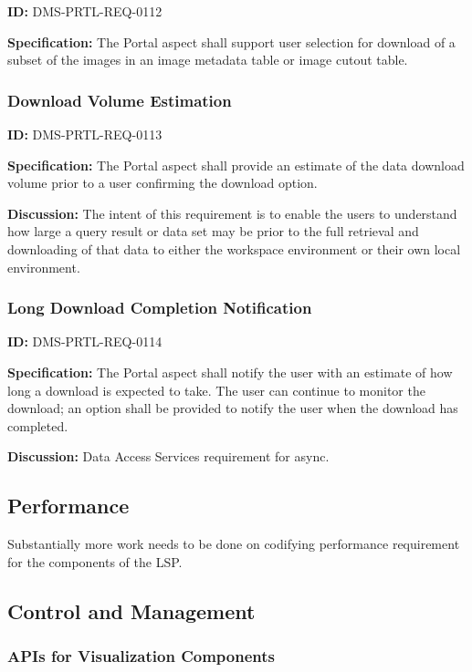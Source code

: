 \documentclass[SE,toc]{lsstdoc}
\begin{document}
\label{DMS-PRTL-REQ-0112}
\textbf{ID:} DMS-PRTL-REQ-0112

\textbf{Specification:}
The Portal aspect shall support user selection for download of a subset of the images in an image metadata table or image cutout table.

\subsubsection{Download Volume Estimation}

\label{DMS-PRTL-REQ-0113}
\textbf{ID:} DMS-PRTL-REQ-0113

\textbf{Specification:}
The Portal aspect shall provide an estimate of the data download volume prior to a user confirming the download option.

\textbf{Discussion:}
The intent of this requirement is to enable the users to understand how large a query result or data set may be prior to the full retrieval and downloading of that data to either the workspace environment or their own local environment.

\subsubsection{Long Download Completion Notification}

\label{DMS-PRTL-REQ-0114}
\textbf{ID:} DMS-PRTL-REQ-0114

\textbf{Specification:}
The Portal aspect shall notify the user with an estimate of how long a download is expected to take. The user can continue to monitor the download; an option shall be provided to notify the user when the download has completed.

\textbf{Discussion:}
Data Access Services requirement for async.

\subsection{Performance}

Substantially more work needs to be done on codifying performance requirement for the components of the LSP.

\subsection{Control and Management}

\subsubsection{APIs for Visualization Components}
\end{document}
